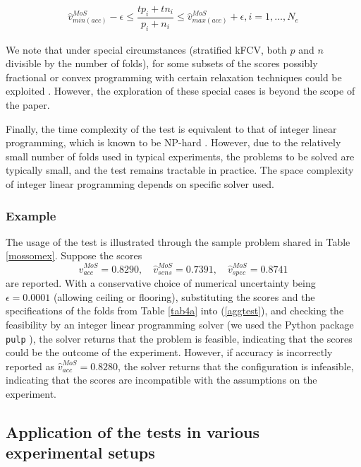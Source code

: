 \documentclass[3p, times]{elsarticle}
\begin{document}
\begin{align}
\hat{v}_{min(acc)}^{MoS} - \epsilon \leq \dfrac{tp_i + tn_i}{p_i + n_i} \leq \hat{v}_{max(acc)}^{MoS} + \epsilon, i = 1, \dots, N_e
\end{align}

We note that under special circumstances (stratified kFCV, both $p$ and $n$ divisible by the number of folds), for some subsets of the scores possibly fractional or convex programming with certain relaxation techniques could be exploited \cite{nonlinear}. However, the exploration of these special cases is beyond the scope of the paper.

{\color{blue} Finally, the time complexity of the test is equivalent to that of integer linear programming, which is known to be NP-hard \cite{ip}. However, due to the relatively small number of folds used in typical experiments, the problems to be solved are typically small, and the test remains tractable in practice. The space complexity of integer linear programming depends on specific solver used.}

\subsubsection{Example}
\label{sec:mosex}

The usage of the test is illustrated through the sample problem shared in Table \ref{mossomex}. Suppose the scores
\begin{equation}
\hat{v}_{acc}^{MoS} = 0.8290, \quad
\hat{v}_{sens}^{MoS} = 0.7391, \quad
\hat{v}_{spec}^{MoS} = 0.8741
\end{equation}
are reported. With a conservative choice of numerical uncertainty being $\epsilon=0.0001$ (allowing ceiling or flooring), substituting the scores and the specifications of the folds from Table \ref{tab4a} into (\ref{aggtest}), and checking the feasibility by an integer linear programming solver (we used the Python package \verb|pulp| \cite{pulp}), the solver returns that the problem is feasible, indicating that the scores could be the outcome of the experiment. However, if accuracy is incorrectly reported as $\hat{v}_{acc}^{MoS} = 0.8280$, the solver returns that the configuration is infeasible, indicating that the scores are incompatible with the assumptions on the experiment.

\subsection{Application of the tests in various experimental setups}
\label{sec:mapping}
\end{document}
